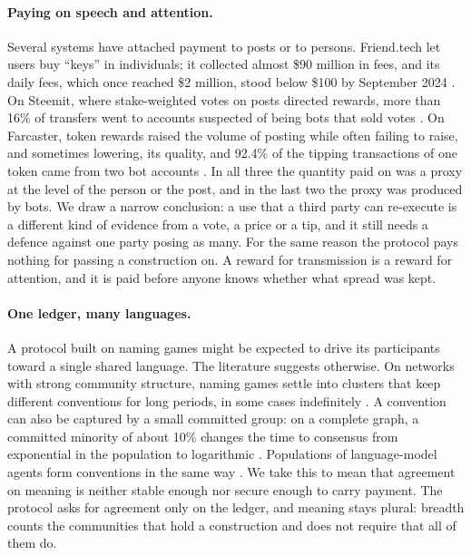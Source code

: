 \paragraph{Paying on speech and attention.} Several systems have attached payment to posts or to persons.
Friend.tech let users buy ``keys'' in individuals; it collected almost \$90 million in fees, and its daily fees,
which once reached \$2 million, stood below \$100 by September 2024 \citep{craig2024friendtech}. On Steemit, where
stake-weighted votes on posts directed rewards, more than 16\% of transfers went to accounts suspected of being bots
that sold votes \citep{li2019steem}. On Farcaster, token rewards raised the volume of posting while often failing to
raise, and sometimes lowering, its quality, and 92.4\% of the tipping transactions of one token came from two bot
accounts \citep{yang2025farcaster}. In all three the quantity paid on was a proxy at the level of the person or the
post, and in the last two the proxy was produced by bots. We draw a
narrow conclusion: a use that a third party can re-execute is a different kind of evidence from a vote, a price or a
tip, and it still needs a defence against one party posing as many. For the same reason the protocol pays nothing for
passing a construction on. A reward for transmission is a reward for attention, and it is paid before anyone knows
whether what spread was kept.

\paragraph{One ledger, many languages.} A protocol built on naming games might be expected to drive its
participants toward a single shared language. The literature suggests otherwise. On networks with strong community
structure, naming games settle into clusters that keep different conventions for long periods, in some cases
indefinitely \citep{lu2009naming,dallasta2006nonequilibrium}. A convention can also be captured by a small committed
group: on a complete graph, a committed minority of about 10\% changes the time to consensus from exponential in the
population to logarithmic \citep{xie2011social}. Populations of language-model agents form conventions in
the same way \citep{ashery2025emergent}. We take this to mean that agreement on meaning is neither stable enough nor
secure enough to carry payment. The protocol asks for agreement only on the ledger, and meaning stays plural: breadth counts the communities that
hold a construction and does not require that all of them do.

